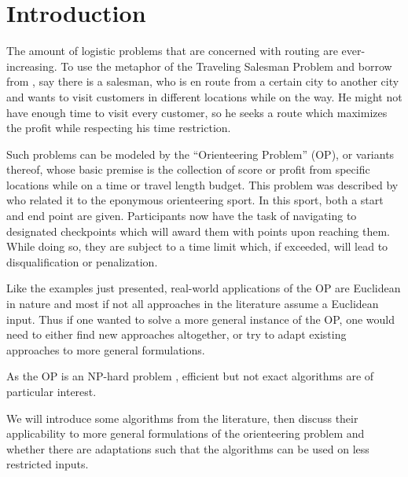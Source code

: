 \section{Introduction}
\label{sec:01:introduction}

The amount of logistic problems that are concerned with routing are ever-increasing.
To use the metaphor of the Traveling Salesman Problem and borrow from \citeauthor{chao_fast_1996} \cite{chao_fast_1996},
say there is a salesman, who is en route from a certain city to another city and wants to visit customers in different locations while on the way.
He might not have enough time to visit every customer, so he seeks a route which maximizes the profit while respecting his time restriction.

Such problems can be modeled by the \enquote{Orienteering Problem} (OP), or variants thereof,
whose basic premise is the collection of score or profit from specific locations while on a time or travel length budget. 
This problem was described by \citeauthor{tsiligiridis_heuristic_1984} \cite{tsiligiridis_heuristic_1984} who related it to the eponymous orienteering sport.
In this sport, both a start and end point are given. Participants now have the task of navigating to designated checkpoints which will award them with points upon reaching them.
While doing so, they are subject to a time limit which, if exceeded, will lead to disqualification or penalization.

Like the examples just presented, real-world applications of the OP are Euclidean in nature and
most if not all approaches in the literature assume a Euclidean input. \cite{vansteenwegen_orienteering_2011}
Thus if one wanted to solve a more general instance of the OP, one would need to either find new approaches altogether,
or try to adapt existing approaches to more general formulations. 

As the OP is an NP-hard problem \cite{golden_orienteering_1987}, efficient but not exact algorithms are of particular interest.

We will introduce some algorithms from the literature, %
then discuss their applicability to more general formulations of the orienteering problem
and whether there are adaptations such that the algorithms can be used on less restricted inputs.
